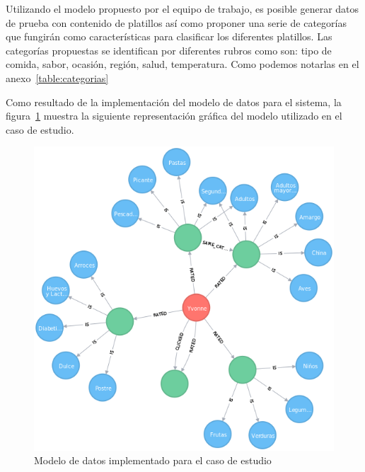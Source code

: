     Utilizando el modelo propuesto por el equipo de trabajo, es posible generar datos de prueba con contenido de platillos así como proponer una serie de categorías que fungirán como características para clasificar los diferentes platillos. Las categorías propuestas se identifican por diferentes rubros como son: tipo de comida, sabor, ocasión, región, salud, temperatura. Como podemos notarlas en el anexo~\ref{table:categorias}


    Como resultado de la implementación del modelo de datos para el sistema, la figura~\ref{fig:neo4j graph} muestra la siguiente representación gráfica del modelo utilizado en el caso de estudio. 
          \begin{figure}[h!]
            \centering
            \includegraphics[width=12cm]{./images/graph}
            \caption{Modelo de datos implementado para el caso de estudio}
            \label{fig:neo4j graph}
          \end{figure}
